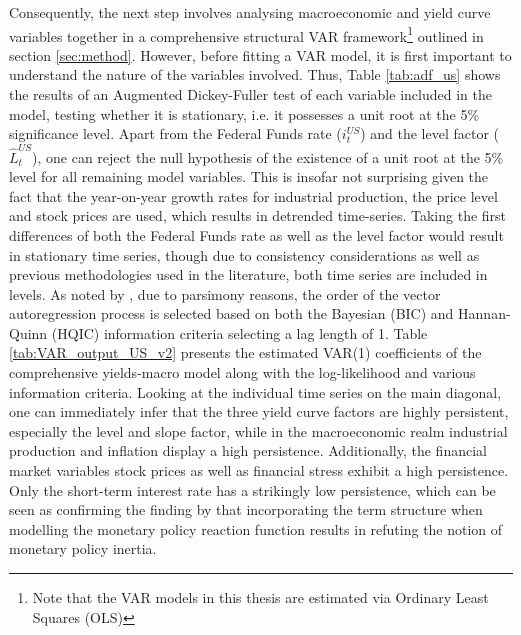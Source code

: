 Consequently, the next step involves analysing macroeconomic and yield curve variables together in a comprehensive structural VAR framework\footnote{Note that the VAR models in this thesis are estimated via Ordinary Least Squares (OLS)} outlined in section \ref{sec:method}. 
However, before fitting a VAR model, it is first important to understand the nature of the variables involved. Thus, Table \ref{tab:adf_us} shows the results of an Augmented Dickey-Fuller test of each variable included in the model, testing whether it is stationary, i.e. it possesses a unit root at the 5\% significance level. 
Apart from the Federal Funds rate ($i^{US}_{t}$) and the level factor ($\hat{L}^{US}_{t}$), one can reject the null hypothesis of the existence of a unit root at the 5\% level for all remaining model variables. 
This is insofar not surprising given the fact that the year-on-year growth rates for industrial production, the price level and stock prices are used, which results in detrended time-series. 
Taking the first differences of both the Federal Funds rate as well as the level factor would result in stationary time series, though due to consistency considerations as well as previous methodologies used in the literature, both time series are included in levels. 
As noted by \citet{morales2010real}, due to parsimony reasons, the order of the vector autoregression process is selected based on both the Bayesian (BIC) and Hannan-Quinn (HQIC) information criteria selecting a lag length of 1. 
Table \ref{tab:VAR_output_US_v2} presents the estimated VAR(1) coefficients of the comprehensive yields-macro model along with the log-likelihood and various information criteria. 
Looking at the individual time series on the main diagonal, one can immediately infer that the three yield curve factors are highly persistent, especially the level and slope factor, while in the macroeconomic realm industrial production and inflation display a high persistence. 
Additionally, the financial market variables stock prices as well as financial stress exhibit a high persistence.  
Only the short-term interest rate has a strikingly low persistence, which can be seen as confirming the finding by \citet{rudebusch2005monetary} that incorporating the term structure when modelling the monetary policy reaction function results in refuting the notion of monetary policy inertia. 


